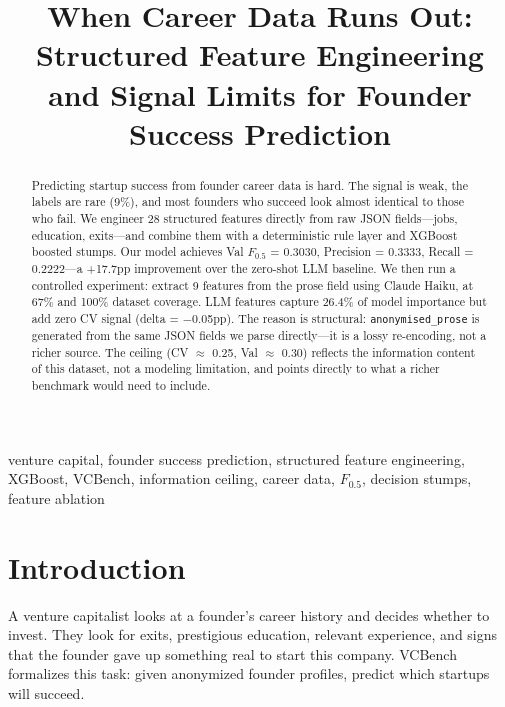 \documentclass[10pt, conference]{IEEEtran}
\begin{document}
\title{When Career Data Runs Out: Structured Feature Engineering and Signal Limits for Founder Success Prediction}

\author{
}

\maketitle

\begin{abstract}
Predicting startup success from founder career data is hard. The signal is weak, the labels are rare (9\%), and most founders who succeed look almost identical to those who fail. We engineer 28 structured features directly from raw JSON fields---jobs, education, exits---and combine them with a deterministic rule layer and XGBoost boosted stumps. Our model achieves Val $F_{0.5}$ = 0.3030, Precision = 0.3333, Recall = 0.2222---a +17.7pp improvement over the zero-shot LLM baseline. We then run a controlled experiment: extract 9 features from the prose field using Claude Haiku, at 67\% and 100\% dataset coverage. LLM features capture 26.4\% of model importance but add zero CV signal (delta = $-$0.05pp). The reason is structural: \texttt{anonymised\_prose} is generated from the same JSON fields we parse directly---it is a lossy re-encoding, not a richer source. The ceiling (CV $\approx$ 0.25, Val $\approx$ 0.30) reflects the information content of this dataset, not a modeling limitation, and points directly to what a richer benchmark would need to include.
\end{abstract}

\begin{IEEEkeywords}
venture capital, founder success prediction, structured feature engineering, XGBoost, VCBench, information ceiling, career data, $F_{0.5}$, decision stumps, feature ablation
\end{IEEEkeywords}

\section{Introduction}

A venture capitalist looks at a founder's career history and decides whether to invest. They look for exits, prestigious education, relevant experience, and signs that the founder gave up something real to start this company. VCBench \cite{vcbench} formalizes this task: given anonymized founder profiles, predict which startups will succeed.
\end{document}
